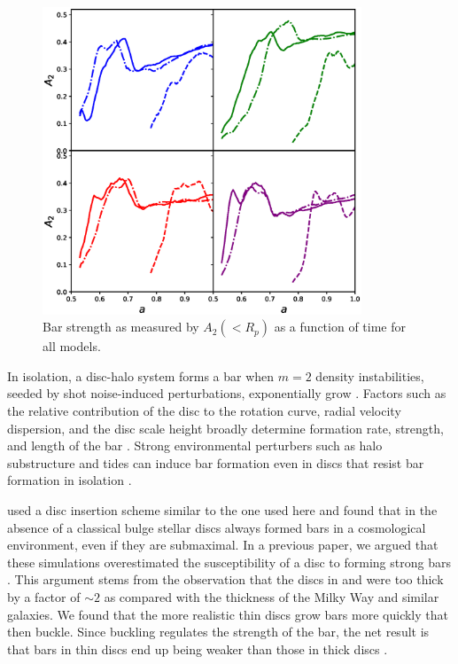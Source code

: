 \begin{figure}
	\centering
	\includegraphics[width=0.85\textwidth]{../figures/a_2_all_models_four_panel.eps}
	\caption{Bar strength as measured by $A_2(<R_p)$ as a function of time for all models.} \label{fig:a_2}
\end{figure}

In isolation, a disc-halo system forms a bar when $m=2$ {density} instabilities,
seeded by shot noise-induced perturbations, exponentially grow
\citep{EfstathiouShotNoise}. Factors such as the relative contribution
of the disc to the rotation curve, radial velocity dispersion, and the
disc scale height broadly determine formation rate, strength, and
length of the bar
\citep{AthanassoulaSellwood1986,ChristodoulouStability1995,
  Klypin2009, Sellwood2013, bauer2018b}.  Strong environmental
perturbers such as halo substructure and tides can induce bar
formation even in discs that resist bar formation in isolation
\citep{gauthier_2006, kazantzidis2008, purcell2011}.

\citet{debuhr_2012,ys_2015} used a disc insertion scheme similar to
the one used here and found that in the absence of a classical bulge
stellar discs always formed bars in a cosmological environment, even
if they are submaximal.  In a previous paper, we argued that these
simulations overestimated the susceptibility of a disc to forming
strong bars \citep{bauer2018b}. This argument stems from the
observation that the discs in \citet{debuhr_2012} and \citet{ys_2015}
were too thick by a factor of $\sim 2$ as compared with the thickness
of the Milky Way and similar galaxies. We found that the more
realistic thin discs grow bars more quickly that then buckle. Since
buckling regulates the strength of the bar, the net result is that
bars in thin discs end up being weaker than those in thick discs
\citep{Klypin2009,bauer2018b}.

